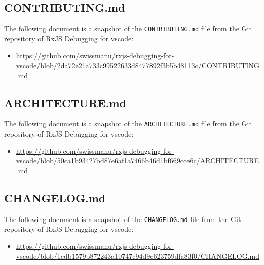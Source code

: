 








\subsection{CONTRIBUTING.md \label{sec:contributing}}
The following document is a snapshot of the \texttt{CONTRIBUTING.md} file from the Git repository of RxJS Debugging for vscode:

\begin{itemize}
  \item \url{https://github.com/swissmanu/rxjs-debugging-for-vscode/blob/2da72e21a733c99522633d8477892f3b5b48113c/CONTRIBUTING.md}
\end{itemize}










\subsection{ARCHITECTURE.md \label{sec:architecture}}
The following document is a snapshot of the \texttt{ARCHITECTURE.md} file from the Git repository of RxJS Debugging for vscode:

\begin{itemize}
  \item \url{https://github.com/swissmanu/rxjs-debugging-for-vscode/blob/50ca1b93427bd87e6af1a7466b46d1bf669cce6c/ARCHITECTURE.md}
\end{itemize}










\subsection{CHANGELOG.md \label{sec:changelog}}
The following document is a snapshot of the \texttt{CHANGELOG.md} file from the Git repository of RxJS Debugging for vscode:

\begin{itemize}
  \item \url{https://github.com/swissmanu/rxjs-debugging-for-vscode/blob/1cdb1579b872243a10747c94d9c623759dfa83f0/CHANGELOG.md}
\end{itemize}

